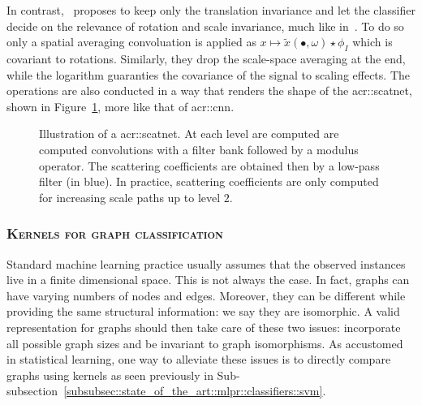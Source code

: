                     In contrast,~\textcite{oyallon2015deep} proposes to keep only the translation invariance and let the classifier decide on the relevance of rotation and scale invariance, much like in~\parencite{cohen2016group}.
                    To do so only a spatial averaging convoluation is applied as $x \mapsto \tilde{x}(\bullet, \omega) \star \phi_I$ which is covariant to rotations.
                    Similarly, they drop the scale-space averaging at the end, while the logarithm guaranties the covariance of the signal to scaling effects.
                    The operations are also conducted in a way that renders the shape of the \gls{acr::scatnet}, shown in Figure~\ref{fig::scatnet}, more like that of \gls{acr::cnn}.

                    \begin{figure}
                        \centering
                        
                        \caption[
                            Illustration of a \acrshort*{acr::scatnet}.
                        ]{
                            \label{fig::scatnet} Illustration of a \gls{acr::scatnet}.
                            At each level are computed are computed convolutions with a filter bank followed by a modulus operator.
                            The scattering coefficients are obtained then by a low-pass filter (in blue).
                            In practice, scattering coefficients are only computed for increasing scale paths up to level $2$.
                        }
                    \end{figure}

        \subsubsection{\textsc{Kernels for graph classification}}
            \label{subsec::state_of_the_art::mlpr::graph_classification}
            Standard machine learning practice usually assumes that the observed instances live in a finite dimensional space.
            This is not always the case.
            In fact, graphs can have varying numbers of nodes and edges.
            Moreover, they can be different while providing the same structural information: we say they are isomorphic.
            A valid representation for graphs should then take care of these two issues: incorporate all possible graph sizes and be invariant to graph isomorphisms.
            As accustomed in statistical learning, one way to alleviate these issues is to directly compare graphs using kernels as seen previously in Sub-subsection~\ref{subsubsec::state_of_the_art::mlpr::classifiers::svm}.\\
            
